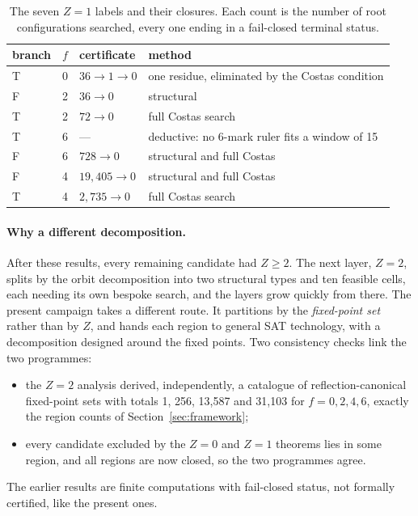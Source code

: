 \documentclass[11pt,a4paper]{article}
\theoremstyle{definition}
\begin{document}
\begin{table}[H]
\centering
\begin{tabular}{@{}llll@{}}
\toprule
branch & $f$ & certificate & method \\
\midrule
T & 0 & $36\to1\to0$ & one residue, eliminated by the Costas condition \\
F & 2 & $36\to0$ & structural \\
T & 2 & $72\to0$ & full Costas search \\
T & 6 & --- & deductive: no 6-mark ruler fits a window of 15 \\
F & 6 & $728\to0$ & structural and full Costas \\
F & 4 & $19{,}405\to0$ & structural and full Costas \\
T & 4 & $2{,}735\to0$ & full Costas search \\
\bottomrule
\end{tabular}
\caption{The seven $Z=1$ labels and their closures. Each count is the number of root
configurations searched, every one ending in a fail-closed terminal status.}
\label{tab:z1}
\end{table}

\paragraph{Why a different decomposition.} After these results, every remaining candidate
had $Z\ge2$. The next layer, $Z=2$, splits by the orbit decomposition into two structural
types and ten feasible cells, each needing its own bespoke search, and the layers grow
quickly from there. The present campaign takes a different route. It partitions by the
\emph{fixed-point set} rather than by $Z$, and hands each region to general SAT
technology, with a decomposition designed around the fixed points. Two consistency checks link
the two programmes:
\begin{itemize}
\item the $Z=2$ analysis derived, independently, a catalogue of reflection-canonical
fixed-point sets with totals 1, 256, 13{,}587 and 31{,}103 for $f=0,2,4,6$, exactly the region
counts of Section~\ref{sec:framework};
\item every candidate excluded by the $Z=0$ and $Z=1$ theorems lies in some region, and all
regions are now closed, so the two programmes agree.
\end{itemize}
The earlier results are finite computations with fail-closed status, not formally certified,
like the present ones.
\end{document}
